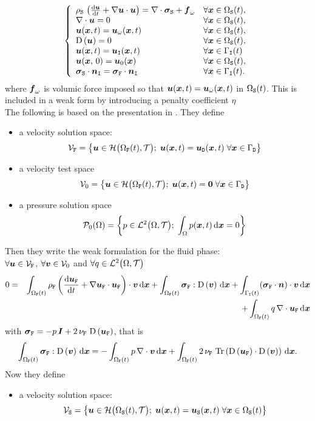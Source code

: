 \documentclass[10pt,a4paper]{article}
\begin{document}
\begin{equation}
\left\{
\begin{array}{ll}
\rhos\,\left(\dt{\vu} + \grad \vu\cdot \vu \right)= \div \vsigmas + {\vf_\labo}& \forall \vx \in \doms(t),\\
\div \vu = 0 & \forall \vx \in \doms(t), \\
\vu(\vx, t) = \vuo(\vx, t) & \forall \vx \in \doms(t), \\
\D{\vu} = 0 & \forall \vx \in \doms(t), \\
\vu(\vx,t)=\vui(\vx,t) & \forall \vx \in \boui(t) \\
\vu(\vx, \,0) = \vu_{\mathrm{0}}(\vx) & \forall \vx \in \doms(t), \\
\vsigmas\cdot \vn_{\labi} = \vsigmaf\cdot \vn_{\labi} & \forall \vx \in \boui(t).
\end{array}
\right.
\end{equation}
where $\vf_\labo$ is volumic force imposed so that $\vu(\vx, t) = \vuo(\vx, t)$ in $\doms(t)$. This is included in a weak form by introducing a penalty coefficient $\eta$
\\

The following is based on the presentation in \cite[]{patankar2000new}. 
%
They define
\begin{itemize}
\item a velocity solution space: 
$$\sVf = \left\{\vu \in \sH\big(\domf(t), \sT\big);\;\vu(\vx, t) = \vud(\vx, t)\; \forall \vx \in \boud \right\}$$
\item a velocity test space 
$$\sV_0 = \left\{\vu \in \sH\big(\domf(t), \sT\big);\;\vu(\vx, t) = \vec 0 \; \forall \vx \in \boud \right\}$$
\item a pressure solution space
$$\sP_0(\dom) = \left\{p \in \sL^2\big(\dom, \sT\big);\; \int_{\dom}p(\vx, t) \,\d\vx = 0 \right\}$$
\end{itemize}

Then they write the weak formulation for the fluid phase:\\
$\forall \vu \in \sVf$, $\forall \vv \in \sV_0$ and $\forall q \in \sL^2\big(\dom, \sT\big)$
%
\begin{eqnarray}
\nonumber 0 &=& \int_{\domf(t)}\rhof\left(\dt \vuf + \grad \vuf \cdot \vuf\right)\cdot\vv \,\d\vx + \int_{\domf(t)}\vsigmaf:\D{\vv} \, \d\vx+\int_{\boui(t)} (\vsigmaf\cdot\vec n) \cdot\vv \,\d\vx  \\
\label{eq:fluid_weak} &&  + \int_{\domf(t)} q\,\div \vuf \,\d\vx 
\end{eqnarray}
with $\vsigmaf = -p\,\Id + 2\,\nuf\,\D{\vuf} $, that is
$$ \int_{\domf(t)}\vsigmaf:\D{\vv} \, \d\vx = -\int_{\domf(t)}p\, \div\vv \, \d\vx + \int_{\domf(t)}2\,\nuf\,\trace{\D{\vuf}\cdot\D{\vv}} \, \d\vx. $$
%
Now they define
\begin{itemize}
\item a velocity solution space: 
$$\sVs = \left\{\vu \in \sH\big(\doms(t), \sT\big);\; \vu(\vx, t) = \vus(\vx, t) \; \forall \vx \in \doms(t) \right\}$$
\end{itemize}
\end{document}
